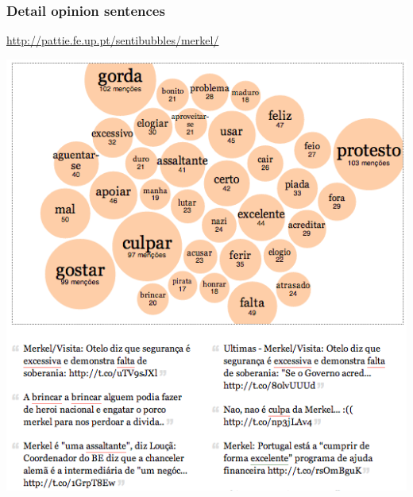 \documentclass[t]{beamer}
\begin{document}
\begin{frame} \frametitle{Detail opinion sentences} %


\begin{block}{\url{http://pattie.fe.up.pt/sentibubbles/merkel/}} 

\begin{center}
     \includegraphics[width=\textwidth]{sentibubbles}
\end{center}

\end{block}


\end{frame} 

\end{document}
